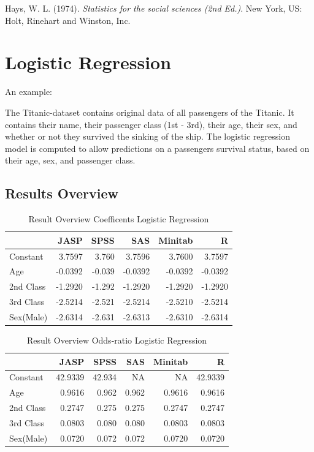 \documentclass[
]{book}
\begin{document}
Hays, W. L. (1974). \emph{Statistics for the social sciences (2nd Ed.)}. New York, US: Holt, Rinehart and Winston, Inc.

\hypertarget{logistic-regression}{%
\section{Logistic Regression}\label{logistic-regression}}

An example:

The Titanic-dataset contains original data of all passengers of the Titanic. It contains their name, their passenger class (1st - 3rd), their age, their sex, and whether or not they survived the sinking of the ship. The logistic regression model is computed to allow predictions on a passengers survival status, based on their age, sex, and passenger class.

\hypertarget{results-overview-2}{%
\subsection{Results Overview}\label{results-overview-2}}

\begin{table}

\caption{\label{tab:unnamed-chunk-94}Result Overview Coefficents Logistic Regression}
\centering
\begin{tabular}[t]{lrrrrr}
\toprule
  & JASP & SPSS & SAS & Minitab & R\\
\midrule
Constant & 3.7597 & 3.760 & 3.7596 & 3.7600 & 3.7597\\
Age & -0.0392 & -0.039 & -0.0392 & -0.0392 & -0.0392\\
2nd Class & -1.2920 & -1.292 & -1.2920 & -1.2920 & -1.2920\\
3rd Class & -2.5214 & -2.521 & -2.5214 & -2.5210 & -2.5214\\
Sex(Male) & -2.6314 & -2.631 & -2.6313 & -2.6310 & -2.6314\\
\bottomrule
\end{tabular}
\end{table}

\begin{table}

\caption{\label{tab:unnamed-chunk-95}Result Overview Odds-ratio Logistic Regression}
\centering
\begin{tabular}[t]{lrrrrr}
\toprule
  & JASP & SPSS & SAS & Minitab & R\\
\midrule
Constant & 42.9339 & 42.934 & NA & NA & 42.9339\\
Age & 0.9616 & 0.962 & 0.962 & 0.9616 & 0.9616\\
2nd Class & 0.2747 & 0.275 & 0.275 & 0.2747 & 0.2747\\
3rd Class & 0.0803 & 0.080 & 0.080 & 0.0803 & 0.0803\\
Sex(Male) & 0.0720 & 0.072 & 0.072 & 0.0720 & 0.0720\\
\bottomrule
\end{tabular}
\end{table}
\end{document}
